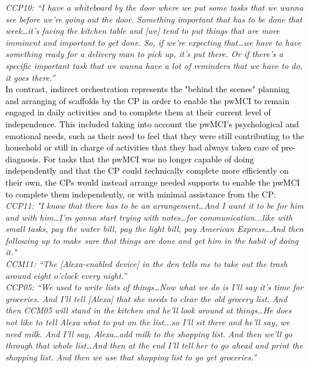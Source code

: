 \documentclass[acmsmall]{acmart}
\begin{document}
\textit{CCP10: “I have a whiteboard by the door where we put some tasks that we wanna see before we're going out the door. Something important that has to be done that week…it's facing the kitchen table and [we] tend to put things that are more imminent and important to get done. So, if we're expecting that…we have to have something ready for a delivery man to pick up, it's put there. Or if there's a specific important task that we wanna have a lot of reminders that we have to do, it goes there.”}
\\

\textcolor{black}{In contrast, indirect orchestration represents the "behind the scenes" planning and arranging of scaffolds by the CP in order to enable the pwMCI to remain engaged in daily activities and to complete them at their current level of independence. This included taking into account the pwMCI's psychological and emotional needs, such as their need to feel that they were still contributing to the household or still in charge of activities that they had always taken care of pre-diagnosis. For tasks that the pwMCI was no longer capable of doing independently and that the CP could technically complete more efficiently on their own, the CPs would instead arrange needed supports to enable the pwMCI to complete them independently, or with minimal assistance from the CP:}
\\

\textit{CCP11: "I know that there has to be an arrangement…And I want it to be for him and with him…I'm gonna start trying with notes…for communication...like with small tasks, pay the water bill, pay the light bill, pay American Express…And then following up to make sure that things are done and get him in the habit of doing it."}
\\

\textit{CCM11: “The [Alexa-enabled device] in the den tells me to take out the trash around eight o'clock every night.”} 
\\

\textit{CCP05: “We used to write lists of things…Now what we do is I'll say it's time for groceries. And I'll tell [Alexa] that she needs to clear the old grocery list. And then CCM05 will stand in the kitchen and he'll look around at things…He does not like to tell Alexa what to put on the list...so I'll sit there and he'll say, we need milk. And I'll say, Alexa…add milk to the shopping list. And then we'll go through that whole list…And then at the end I'll tell her to go ahead and print the shopping list. And then we use that shopping list to go get groceries.”}
\\
\end{document}
